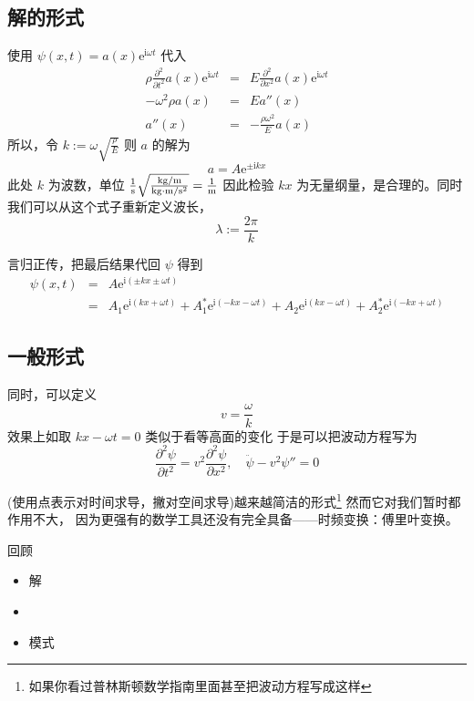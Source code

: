 \documentclass[11pt]{book}
\begin{document}
\subsection{解的形式}
\label{sec:orgbe70047}
使用 \(\psi(x,t)=a(x)\mathrm{e}^{\mathrm{i}\omega t}\) 代入
\begin{eqnarray}
\label{eq:12}
\rho \frac{\partial^2}{\partial t^2}a(x)\mathrm{e}^{\mathrm{i}\omega t} & = & E \frac{\partial^2}{\partial x^2}a(x)\mathrm{e}^{\mathrm{i}\omega t}\\
-\omega^2\rho a(x) &=& E a''(x) \\
a''(x)&=&-\frac{\rho\omega^2}{E}a(x)
\end{eqnarray}
所以，令 \(k:=\omega \sqrt{\frac{\rho}{E}}\) 则 \(a\) 的解为 $$a=A\mathrm{e}^{\pm\mathrm{i}kx}$$
此处 \(k\) 为波数，单位 \(\rm{}\frac{1}{s}\sqrt{\frac{kg/m}{kg\cdot m/s^2}}=\frac{1}{m}\) 因此检验 \(kx\) 为无量纲量，是合理的。同时我们可以从这个式子重新定义波长，
$$\lambda := \frac{2\pi}{k} $$

言归正传，把最后结果代回 \(\psi\) 得到
\begin{eqnarray}
\label{eq:13}
\psi(x,t)&=&A\mathrm{e}^{\mathrm{i}(\pm kx\pm\omega t)}\\
&=&A_1\mathrm{e}^{\mathrm{i}(kx+\omega t)}+A_1^{*}\mathrm{e}^{\mathrm{i}(-kx-\omega t)}+A_2\mathrm{e}^{\mathrm{i}(kx-\omega t)}+A_2^{*}\mathrm{e}^{\mathrm{i}(-kx+\omega t)}
\end{eqnarray}
\subsection{一般形式}
\label{sec:org8761d52}
同时，可以定义 $$v=\frac{\omega}{k}$$
效果上如取 \(kx-\omega t=0\) 类似于看等高面的变化
于是可以把波动方程写为
\begin{equation}
\label{eq:14}
\frac{\partial^2\psi}{\partial t^2}=v^{2} \frac{\partial^2 \psi}{\partial x^2},\quad \ddot{\psi}-v^2\psi''=0
\end{equation}

(使用点表示对时间求导，撇对空间求导)越来越简洁的形式\footnote{如果你看过普林斯顿数学指南里面甚至把波动方程写成这样}
然而它对我们暂时都作用不大，
因为更强有的数学工具还没有完全具备——时频变换：傅里叶变换。


\begin{center}
回顾
\begin{itemize}
\item 解
\item 

\item 模式
\end{itemize}
\end{center}
\end{document}
